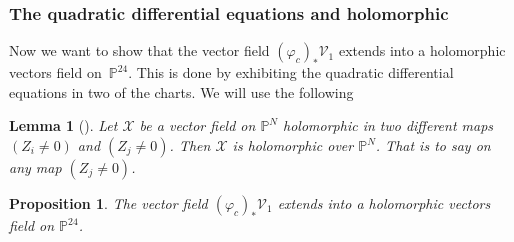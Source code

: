 \documentclass[10pt,a4paper]{amsart}
\numberwithin{equation}{section}
\newtheorem{Lemma}[Theorem]{Lemma}
\newtheorem{Proposition}[Theorem]{Proposition}
 { \theoremstyle{definition}
\newtheorem{Definition}[Theorem]{Definition}
\newtheorem{Note}[Theorem]{Note}
\newtheorem{Example}[Theorem]{Example}
\newtheorem{Remark}[Theorem]{Remark} }
\begin{document}
\subsubsection{The quadratic differential equations and holomorphic}
Now we want to show that the vector field
$(\varphi_c)_{\ast}\mathcal{V}_1$ extends into a
holomorphic vectors field on~$\mathbb{P}^{24}$.
 This is done by
exhibiting the quadratic differential equations in two of the
charts. We will use the following
\begin{Lemma}[{\cite{al_Moer3}}] Let $\mathcal{X}$ be a vector field on
$\mathbb{P}^{N}$ holomorphic in two different maps $(Z_i\neq
0)$ and $(Z_j\neq 0)$. Then $\mathcal{X}$ is
holomorphic over $\mathbb{P}^{N}$. That is to say on any map
$(Z_j\neq 0)$.
\end{Lemma}
\begin{Proposition} The vector field
$(\varphi_c)_{\ast}\mathcal{V}_1$ extends into a
holomorphic vectors field on $\mathbb{P}^{24}$.
\end{Proposition}
\end{document}
